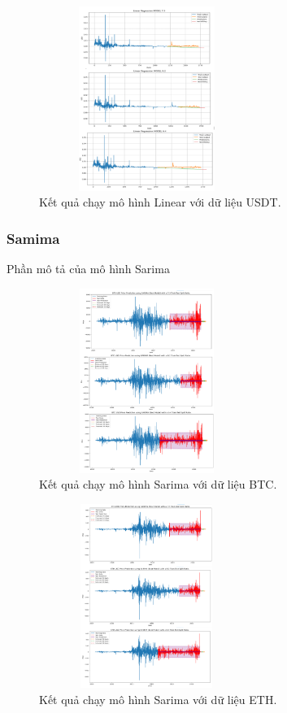 \documentclass[conference]{IEEEtran}
\begin{document}
\begin{figure}[H] %
    \centering
    \includegraphics[width=7cm, height=6cm]{Images/Linear-USDT.png} %
    \caption{Kết quả chạy mô hình Linear với dữ liệu USDT.}
    \label{fig:arima-model}
\end{figure}

\subsubsection{Samima}
Phần mô tả của mô hình Sarima

\begin{figure}[H] %
    \centering
    \includegraphics[width=7cm, height=6cm]{Images/Sarima-BTC.png} %
    \caption{Kết quả chạy mô hình Sarima với dữ liệu BTC.}
    \label{fig:arima-model}
\end{figure}

\begin{figure}[H] %
    \centering
    \includegraphics[width=7cm, height=6cm]{Images/Sarima-ETH.png} %
    \caption{Kết quả chạy mô hình Sarima với dữ liệu ETH.}
    \label{fig:arima-model}
\end{figure}
\end{document}
